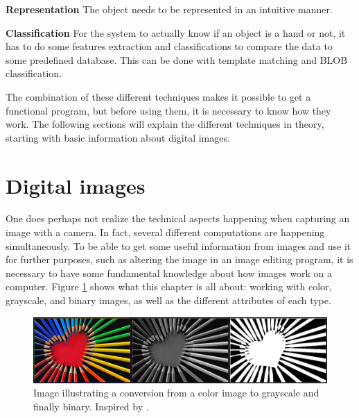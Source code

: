 \textbf{Representation}
The object needs to be represented in an intuitive manner.

\textbf{Classification}
For the system to actually know if an object is a hand or not, it has to do some features extraction and classifications to compare the data to some predefined database. This can be done with template matching and BLOB classification.


The combination of these different techniques makes it possible to get a functional program, but before using them, it is necessary to know how they work. The following sections will explain the different techniques in theory, starting with basic information about digital images.

\section{Digital images}
One does perhaps not realize the technical aspects happening when capturing an image with a camera. In fact, several different computations are happening simultaneously. To be able to get some useful information from images and use it for further purposes, such as altering the image in an image editing program, it is necessary to have some fundamental knowledge about how images work on a computer. Figure \ref{fig:ip_ColoredToGrayscaleToBinary} shows what this chapter is all about: working with color, grayscale, and binary images, as well as the different attributes of each type.

\begin{figure}[htbp]
\centering
\includegraphics[width=1.00\textwidth]{Pictures/Theory/ColoredToGrayscaleToBinary.jpg}
\caption{Image illustrating a conversion from a color image to grayscale and finally binary. Inspired by \citep{colorPencils}.}
\label{fig:ip_ColoredToGrayscaleToBinary}
\end{figure}

